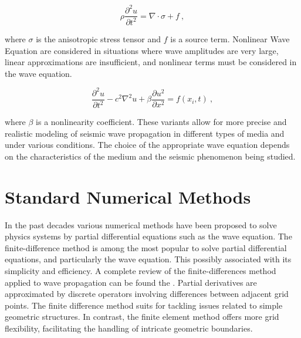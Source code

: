 \documentclass[11pt,twoside]{article}
\begin{document}
\begin{equation*}
\rho \frac{\partial^2 u}{\partial t^2} = \nabla \cdot \sigma + f \ ,
\label{anisotropic}
\end{equation*}
    
where $\sigma$ is the anisotropic stress tensor and $f$ is a source term. Nonlinear Wave Equation are considered 
in situations where wave amplitudes are very large, linear approximations are insufficient, and nonlinear terms 
must be considered in the wave equation.

\begin{equation*}
\frac{\partial^2 u}{\partial t^2} - c^2 \nabla^2 u + \beta \frac{\partial u^2}{\partial x^2} = f(x_i, t) \ ,
\label{nonlinear}
\end{equation*}
    
where $\beta$ is a nonlinearity coefficient. These variants allow for more precise and realistic modeling 
of seismic wave propagation in different types of media and  under various conditions. The choice of the 
appropriate wave equation depends on the characteristics of the medium and the seismic phenomenon being studied.

\section{Standard Numerical Methods}\label{sec:standard_numerical_methods}

In the past decades various numerical methods have been proposed to solve physics systems by partial differential equations such as the 
wave equation. The finite-difference method is among the most popular to solve partial differential equations, and particularly the wave 
equation. This possibly associated with its simplicity and efficiency. A complete review of the finite-differences method applied 
to wave propagation can be found the . Partial derivatives are approximated by discrete operators 
involving differences between adjacent grid points. The finite difference method suits for tackling issues related to simple 
geometric structures. In contrast, the finite element method offers more grid flexibility, facilitating the handling of intricate 
geometric boundaries.
\end{document}
